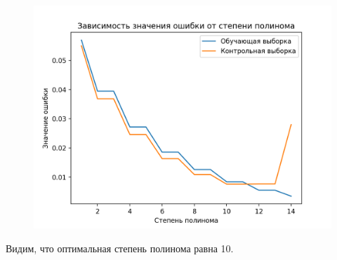 \documentclass[12pt]{report}
\begin{document}
\begin{figure}[h!]
  \centering
  \includegraphics[width = \linewidth]{res_2_3.png}
  \caption{}
  \label{fig:points6}
\end{figure}


Видим, что оптимальная степень полинома равна 10.


\printbibliography[title={СПИСОК ИСПОЛЬЗОВАННЫХ\\ ИСТОЧНИКОВ}]
\end{document}
